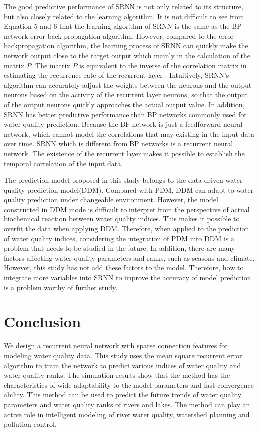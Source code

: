 \documentclass[runningheads]{llncs}
\begin{document}
The good predictive performance of SRNN is not only related to 
its structure, but also closely related to the learning algorithm.
It is not difficult to see from Equation 5 and 6 that the 
learning algorithm of SRNN is the same as the BP network error 
back propagation algorithm. However, compared to the error 
backpropagation algorithm, the learning process of SRNN can 
quickly make the network output close to the target output 
which mainly in the calculation of the matrix $P$. The matrix $P$ 
is equivalent to the inverse of the correlation matrix in 
estimating the recurrence rate of the recurrent layer \cite{RN23}. 
Intuitively, SRNN's algorithm can accurately adjust the weights 
between the neurons and the output neurons based on the activity 
of the recurrent layer neurons, so that the output of the 
output neurons quickly approaches the actual output value. 
In addition, SRNN has better predictive performance than BP 
networks commonly used for water quality prediction. Because 
the BP network is just a feedforward neural network, which 
cannot model the correlations that may existing in the input data 
over time. SRNN which is different from BP networks is a recurrent neural 
network. The existence of the recurrent layer makes it possible 
to establish the temporal correlation of the input data. 

The prediction model proposed in this study belongs to the 
data-driven water quality prediction model(DDM). Compared with
PDM, DDM can adapt to water quality prediction under changeable 
environment. However, the model constructed in DDM mode is 
difficult to interpret from the perspective of actual biochemical 
reaction between water quality indices. This makes it possible
to overfit the data when applying DDM. Therefore, when applied to 
the prediction of water quality indices, considering the integration 
of PDM into DDM is a problem that needs to be studied in the future.
In addition, there are many factors affecting water quality parameters 
and ranks, such as seasons and climate. However, this study has not add 
these factors to the model. Therefore, how to integrate more variables 
into SRNN to improve the accuracy of model prediction is a problem 
worthy of further study.  

\section{Conclusion}
We design a recurrent neural network with sparse
connection features for modeling water quality data. 
This study uses the mean square recurrent error algorithm 
to train the network to predict various indices of water 
quality and water quality ranks. The simulation results 
show that the method has the characteristics of wide 
adaptability to the model parameters and fast convergence ability.
This method can be used to predict the future trends of
water quality parameters and water quality ranks of 
rivers and lakes. The method can play an active role 
in intelligent modeling of river water quality, 
watershed planning and pollution control.
%
%
%
 
 
\end{document}

